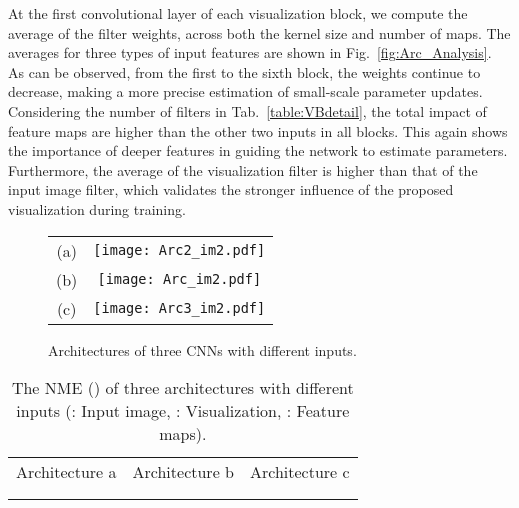 At the first convolutional layer of each visualization block, we compute the average of the filter weights, across both the kernel size and number of maps.
The averages for three types of input features are shown in Fig.~\ref{fig:Arc_Analysis}.
As can be observed, from the first to the sixth block, the weights continue to decrease, making a more precise estimation of small-scale parameter updates. 
Considering the number of filters in Tab.~\ref{table:VBdetail}, the total impact of feature maps are higher than the other two inputs in all blocks. 
This again shows the importance of deeper features in guiding the network to estimate parameters. 
Furthermore, the average of the visualization filter is higher than that of the input image filter, which validates the stronger influence of the proposed visualization during training. 





\begin{figure}[t!]\small
\begin{center}
\begin{tabular}{cc}
(a) & \texttt{[image: Arc2\_im2.pdf]} \\
(b) & \texttt{[image: Arc\_im2.pdf]} \\
(c) & \texttt{[image: Arc3\_im2.pdf]}
\end{tabular}
\end{center}
\figvspace
\caption{Architectures of three CNNs with different inputs.} 
\label{fig:Arc}\figvspace
\end{figure}


\begin{table}[t!]\small
\caption{The NME () of three architectures with different inputs (: Input image, : Visualization, : Feature maps).}\figvspace
\begin{center}
\begin{tabular}{ c|c|c } 
 \hline
 Architecture a & Architecture b & Architecture c \\ 
  &  & \\
 \hline
  &  &  \\
 \hline  
\end{tabular}
\end{center}
\label{table:diffArch}
\end{table}






